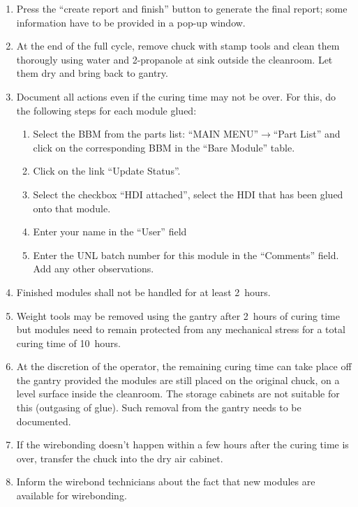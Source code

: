 \documentclass[12pt]{unlsilabsop}
\begin{document}
\begin{enumerate}
    \item Press the ``create report and finish'' button to generate the final report; some information have to be provided in a pop-up window.
    \item At the end of the full cycle, remove chuck with stamp tools and clean them thorougly using water and 2-propanole at sink outside the cleanroom. Let them dry and bring back to gantry.
    \item Document all actions even if the curing time may not be over. For this, do the following steps for each module glued:
    \begin{enumerate}
        \item Select the BBM from the parts list: ``MAIN MENU''$\rightarrow$``Part List'' and click on the corresponding BBM in the ``Bare Module'' table.
        \item Click on the link ``Update Status''.
        \item Select the checkbox ``HDI attached'', select the HDI that has been glued onto that module.
        \item Enter your name in the ``User'' field
        \item Enter the UNL batch number for this module in the ``Comments'' field. Add any other observations.
    \end{enumerate}
    \item Finished modules shall not be handled for at least 2~hours.
    \item Weight tools may be removed using the gantry after 2~hours of curing time but modules need to remain protected from any mechanical stress for a total curing time of 10~hours.
    \item At the discretion of the operator, the remaining curing time can take place off the gantry provided the modules are still placed on the original chuck, on a level surface inside the cleanroom. The storage cabinets are not suitable for this (outgasing of glue). Such removal from the gantry needs to be documented.
    \item If the wirebonding doesn't happen within a few hours after the curing time is over, transfer the chuck into the dry air cabinet.
    \item Inform the wirebond technicians about the fact that new modules are available for wirebonding.
\end{enumerate}

\end{document}
